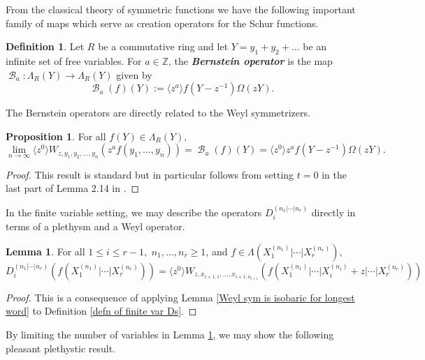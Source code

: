 \documentclass[12pt,reqno]{amsart}
\theoremstyle{definition}
\newtheorem{lem}[thm]{Lemma}
\newtheorem{prop}[thm]{Proposition}
\newtheorem{defn}[thm]{Definition}
\DeclareMathOperator{\cB}{\mathcal{B}}
\begin{document}
From the classical theory of symmetric functions we have the following important family of maps which serve as creation operators for the Schur functions.

\begin{defn}
    Let $R$ be a commutative ring and let $Y=y_1+y_2+\ldots$ be an infinite set of free variables. For $a \in\mathbb{Z}$, the \textbf{\textit{Bernstein operator}} is the map $\cB_a:\Lambda_R(Y) \rightarrow \Lambda_R(Y)$ given by 
    $$\cB_a(f)(Y):= \langle z^a \rangle f(Y-z^{-1})\Omega(zY).$$ 
\end{defn}


The Bernstein operators are directly related to the Weyl symmetrizers.

\begin{prop}\label{Weyls limit to Bernstein prop}
For all $f(Y) \in \Lambda_{R}(Y),$
    $$\lim_{n \rightarrow \infty} \langle z^0 \rangle W_{z,y_1,y_2,\ldots,y_n}(z^af(y_1,\ldots,y_n)) = \cB_a(f)(Y) = \langle z^0 \rangle z^a f(Y-z^{-1}) \Omega(zY).$$
\end{prop}
\begin{proof}
    This result is standard but in particular follows from setting $t=0$ in the last part of Lemma 2.14 in \cite{BWAlmostSymSchur}.
\end{proof}

In the finite variable setting, we may describe the operators $D_i^{(n_1|\cdots|n_r)}$ directly in terms of a plethysm and a Weyl operator.

\begin{lem}\label{Ds into Ws lemma}
For all $1\leq i \leq r-1,$ $n_1,\ldots , n_r \geq 1$, and $f\in \Lambda(X_1^{(n_1)}|\cdots | X_r^{(n_r)}),$
    $$D_i^{(n_1|\cdots|n_r)}(f(X_1^{(n_1)}|\cdots | X_r^{(n_r)})) = \langle z^0\rangle W_{z,x_{i+1,1},\ldots,x_{i+1,n_{i+1}}}(f(X_1^{(n_1)}|\cdots| X_i^{(n_i)}+z | \cdots | X_r^{(n_r)}))$$
\end{lem}
\begin{proof}
    This is a consequence of applying Lemma \ref{Weyl sym is isobaric for longest word} to Definition \ref{defn of finite var Ds}.
\end{proof}

By limiting the number of variables in Lemma \ref{Ds into Ws lemma}, we may show the following pleasant plethystic result. 
\end{document}
